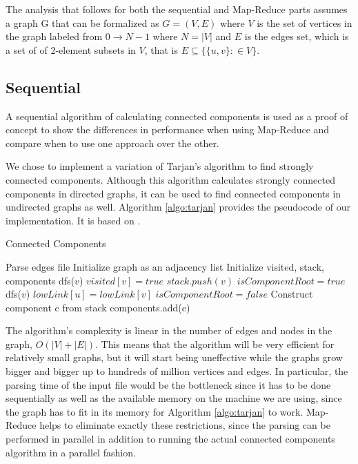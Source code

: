 The analysis that follows for both the sequential and Map-Reduce parts assumes a graph G that can be formalized as $G=(V,E)$ where $V$ is the set of vertices in the graph labeled from $0 \to N-1$ where $N=|V|$ and $E$ is the edges set, which is a set of of 2-element subsets in $V$, that is $E \subseteq \{\{u,v\}: \in V\}$.

\subsection{Sequential}
A sequential algorithm of calculating connected components is used as a proof of concept to show the differences in performance when using Map-Reduce and compare when to use one approach over the other.

We chose to implement a variation of Tarjan's algorithm to find strongly connected components. Although this algorithm calculates strongly connected components in directed graphs, it can be used to find connected components in undirected graphs as well. Algorithm \ref{algo:tarjan} provides the pseudocode of our implementation. It is based on \cite{tarjan}.

\begin{algorithm}
	\caption{Connected Components}
	\label{algo:tarjan}
	\begin{algorithmic}[1]
		\State Parse edges file
		\State Initialize graph as an adjacency list
		\State Initialize visited, stack, components
				\State dfs($v$)
			\EndIf
		\EndFor
			\State $visited[v] = true$
			\State $stack.push(v)$
			\State $isComponentRoot = true$
					\State dfs($v$)
				\EndIf
					\State $lowLink[u] = lowLink[v]$
					\State $isComponentRoot = false$
				\EndIf
			\EndFor
				\State Construct component c from stack
				\State components.add(c)
			\EndIf
		\EndFunction
	\end{algorithmic}
\end{algorithm}

The algorithm's complexity is linear in the number of edges and nodes in the graph, \ie $O(|V| + |E|)$. This means that the algorithm will be very efficient for relatively small graphs, but it will start being uneffective while the graphs grow bigger and bigger up to hundreds of million vertices and edges. In particular, the parsing time of the input file would be the bottleneck since it has to be done sequentially as well as the available memory on the machine we are using, since the graph has to fit in its memory for Algorithm \ref{algo:tarjan} to work. Map-Reduce helps to eliminate exactly these restrictions, since the parsing can be performed in parallel in addition to running the actual connected components algorithm in a parallel fashion.

